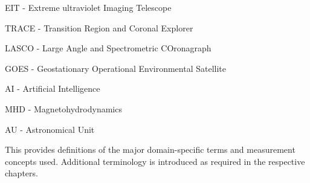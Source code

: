 \documentclass{article}
\begin{document}
EIT - Extreme ultraviolet Imaging Telescope

TRACE - Transition Region and Coronal Explorer

LASCO - Large Angle and Spectrometric COronagraph

GOES - Geostationary Operational Environmental Satellite

AI - Artificial Intelligence

MHD - Magnetohydrodynamics

AU - Astronomical Unit

This provides definitions of the major domain-specific terms and measurement concepts used. Additional terminology is introduced as required in the respective chapters.






























\end{document}

